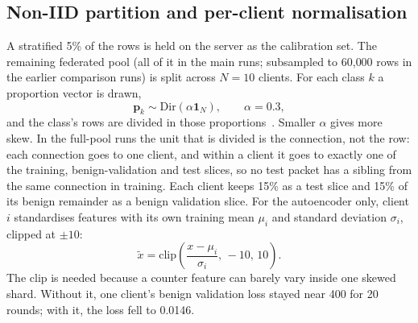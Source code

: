 \subsection{Non-IID partition and per-client normalisation}
A stratified 5\% of the rows is held on the server as the calibration set. The remaining federated pool (all of it in the main runs; subsampled to 60{,}000 rows in the earlier comparison runs) is split across $N=10$ clients. For each class $k$ a proportion vector is drawn,
\begin{equation}
  \mathbf{p}_k \sim \mathrm{Dir}(\alpha\mathbf{1}_N), \qquad \alpha = 0.3,
\end{equation}
and the class's rows are divided in those proportions~\cite{hsu2019noniid}. Smaller $\alpha$ gives more skew. In the full-pool runs the unit that is divided is the connection, not the row: each connection goes to one client, and within a client it goes to exactly one of the training, benign-validation and test slices, so no test packet has a sibling from the same connection in training. Each client keeps 15\% as a test slice and 15\% of its benign remainder as a benign validation slice. For the autoencoder only, client $i$ standardises features with its own training mean $\mu_i$ and standard deviation $\sigma_i$, clipped at $\pm10$:
\begin{equation}
  \tilde{x} = \mathrm{clip}\!\left(\frac{x-\mu_i}{\sigma_i},\,-10,\,10\right).
\end{equation}
The clip is needed because a counter feature can barely vary inside one skewed shard. Without it, one client's benign validation loss stayed near 400 for 20 rounds; with it, the loss fell to 0.0146.

